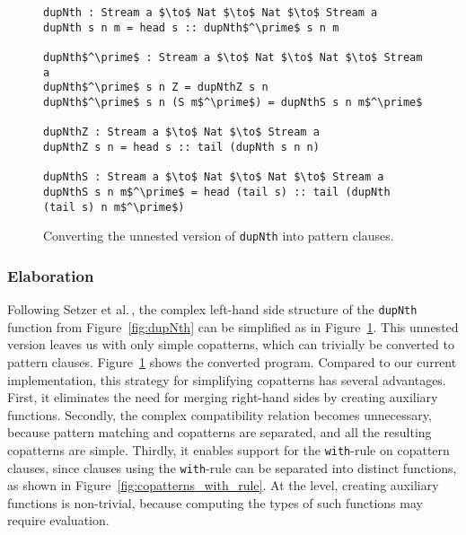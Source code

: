 \begin{figure}
\begin{lstlisting}[mathescape]
dupNth : Stream a $\to$ Nat $\to$ Nat $\to$ Stream a
dupNth s n m = head s :: dupNth$^\prime$ s n m

dupNth$^\prime$ : Stream a $\to$ Nat $\to$ Nat $\to$ Stream a
dupNth$^\prime$ s n Z = dupNthZ s n
dupNth$^\prime$ s n (S m$^\prime$) = dupNthS s n m$^\prime$

dupNthZ : Stream a $\to$ Nat $\to$ Stream a
dupNthZ s n = head s :: tail (dupNth s n n)

dupNthS : Stream a $\to$ Nat $\to$ Nat $\to$ Stream a
dupNthS s n m$^\prime$ = head (tail s) :: tail (dupNth (tail s) n m$^\prime$)
\end{lstlisting}
  
  \caption{Converting the unnested version of \texttt{dupNth} into pattern clauses.}
  \label{fig:dupNth_unnesting_pattern_clauses}
\end{figure}

\subsubsection{Elaboration}
Following Setzer et al.\,\citep{Setzer14Unnesting}, the complex left-hand side
structure of the \texttt{dupNth} function from Figure~\ref{fig:dupNth} can be
simplified as in Figure~\ref{fig:dupNth_unnesting_pattern_clauses}. This unnested version leaves
us with only simple copatterns, which can trivially be converted to pattern
clauses. Figure~\ref{fig:dupNth_unnesting_pattern_clauses} shows the converted
program. Compared to our current implementation, this strategy for simplifying
copatterns has several advantages. First, it eliminates the need for merging
right-hand sides by creating auxiliary functions. Secondly, the complex
compatibility relation becomes unnecessary, because pattern matching and
copatterns are separated, and all the resulting copatterns are simple. Thirdly,
it enables support for the \texttt{with}-rule on copattern clauses, since
clauses using the \texttt{with}-rule can be separated into distinct functions,
as shown in Figure~\ref{fig:copatterns_with_rule}. At the \IdrisM{} level,
creating auxiliary functions is non-trivial, because computing the types of such
functions may require evaluation.

